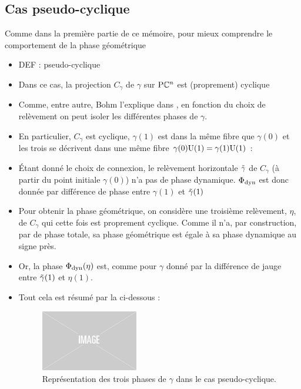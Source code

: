 \subsection{Cas pseudo-cyclique}

Comme dans la première partie de ce mémoire, pour mieux comprendre le comportement de la phase géométrique 

\begin{itemize}
	\item DEF : pseudo-cyclique
	
	\item Dans ce cas, la projection $C_\gamma$ de $\gamma$ sur $\text{\normalfont P}\mathbb{C}^{n}$ est (proprement) cyclique
	
	\item Comme, entre autre, Bohm l'explique dans \cite{bohm_geometric_2003}, en fonction du choix de relèvement on peut isoler les différentes phases de $\gamma$. 
	
	\item En particulier, $C_\gamma$ est cyclique, $\gamma(1)$ est dans la même fibre que $\gamma(0)$ et les trois se décrivent dans une même fibre $\gamma(0)\text{\normalfont U}(1) = \gamma(1)\text{\normalfont U}(1)$ :
	
	\item Étant donné le choix de connexion, le relèvement horizontale $\Tilde{\gamma}$ de $C_\gamma$ (à partir du point initiale $\gamma(0)$) n'a pas de phase dynamique. $\Phi_{\text{\normalfont dyn}}$ est donc donnée par différence de phase entre $\gamma(1)$ et $\Tilde{\gamma}(1)$
	
	\item Pour obtenir la phase géométrique, on considère une troisième relèvement, $\eta$, de $C_\gamma$ qui cette fois est proprement cyclique. Comme il n'a, par construction, par de phase totale, sa phase géométrique est égale à sa phase dynamique au signe près.
	
	\item Or, la phase $\Phi_{\text{\normalfont dyn}}(\eta)$ est, comme pour $\gamma$ donné par la différence de jauge entre $\Tilde{\gamma}(1)$ et $\eta(1)$.
	
	\item Tout cela est résumé par la  ci-dessous :
	\begin{figure}[h]
		\includegraphics[width=0.4\textwidth]{fig/placeholder}
		\caption[Représentation des trois phases de $\gamma$ dans le cas pseudo-cyclique]{Représentation des trois phases de $\gamma$ dans le cas pseudo-cyclique.}
		\label{fig:phases_p-cycl}
	\end{figure}
	

\end{itemize}
